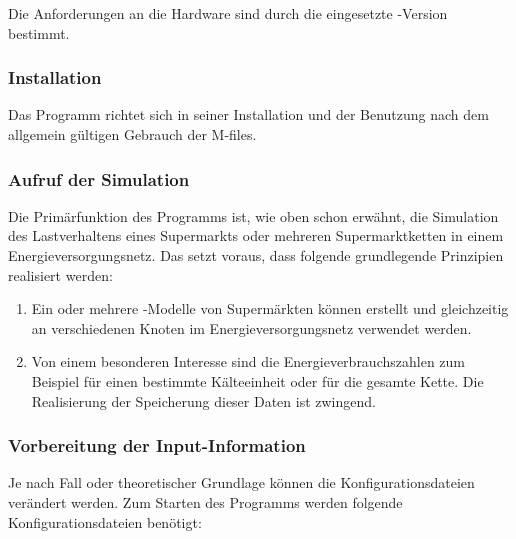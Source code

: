 Die Anforderungen an die Hardware sind durch die eingesetzte \matlab-Version
bestimmt.

\subsubsection{Installation}

Das Programm richtet sich in seiner Installation und der Benutzung nach dem
allgemein gültigen Gebrauch der \matlab M-files.

\subsubsection{Aufruf der Simulation}%

Die Primärfunktion des Programms ist, wie oben schon erwähnt, die Simulation des
Lastverhaltens eines Supermarkts oder mehreren Supermarktketten in einem
Energieversorgungsnetz. Das setzt voraus, dass folgende grundlegende Prinzipien
realisiert werden:
\begin{enumerate}
	\item Ein oder mehrere \matlab-Modelle von Supermärkten können erstellt
	und gleichzeitig an verschiedenen Knoten im Energieversorgungsnetz
	verwendet werden.
	\item Von einem besonderen Interesse sind die Energieverbrauchszahlen
	zum Beispiel für einen bestimmte Kälteeinheit oder für die gesamte
	Kette. Die Realisierung der Speicherung dieser Daten ist zwingend.
\end{enumerate}

\subsubsection*{Vorbereitung der Input-Information}
\label{sec:input_infos}

Je nach Fall oder theoretischer Grundlage können die Konfigurationsdateien
verändert werden.  Zum Starten des Programms werden
folgende Konfigurationsdateien benötigt:

